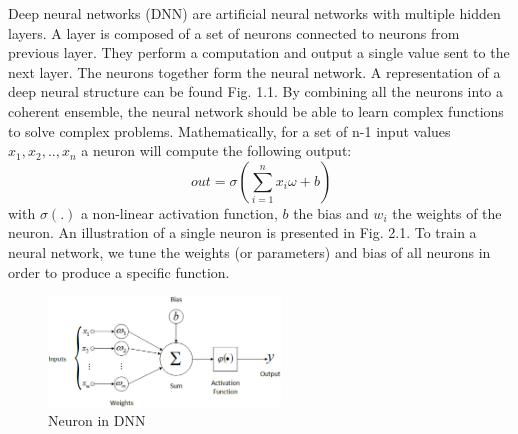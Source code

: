 \documentclass[english, LaM, oneside]{sapthesis}%
\begin{document}
Deep neural networks (DNN) are artificial neural networks with multiple hidden layers. A layer is composed of a set of neurons connected to neurons from previous layer. They perform a computation and output a single value sent to the next layer. The neurons together form the neural network. A representation of a deep neural structure can be found Fig. 1.1. By combining all the neurons into a coherent ensemble, the neural network should be able to learn complex functions to solve complex problems.
Mathematically, for a set of n-1 input values $x_1, x_2, .., x_n$ a neuron will compute the following output:
\[\ out = \sigma( \sum_{i=1}^{n}{x_i \omega+ b })\]
with $\sigma(.)$ a non-linear activation function, $b$ the bias and $w_i$ the weights of the neuron. An illustration of a single neuron is presented in Fig. 2.1. To train a neural network, we tune the weights (or parameters) and bias of all neurons in order to produce a specific function.

\begin{figure}[!h]
            \centering
            \includegraphics[width=0.55\textwidth]{MLP}
            \caption{Neuron in DNN}
            \label{fig:mlp}
        \end{figure}
        
\end{document}
